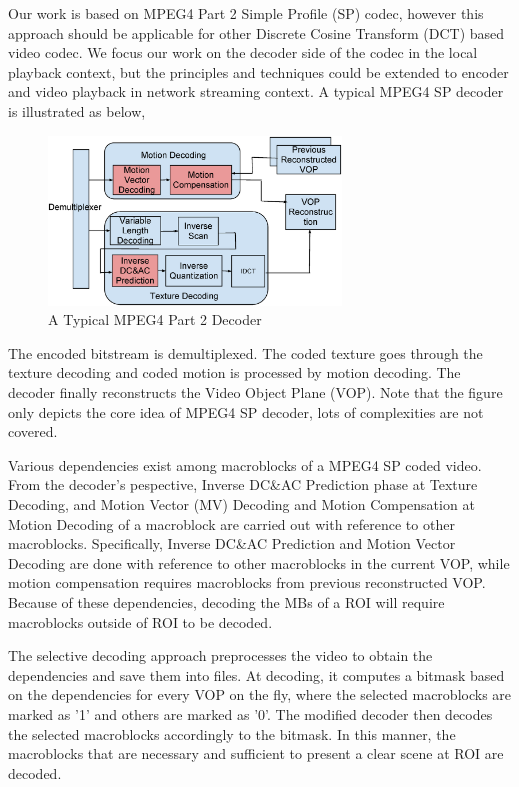 Our work is based on MPEG4 Part 2 Simple Profile (SP) codec, however this approach should be applicable for other Discrete Cosine Transform (DCT) based video codec. We focus our work on the decoder side of the codec in the local playback context, but the principles and techniques could be extended to encoder and video playback in network streaming context. A typical MPEG4 SP decoder is illustrated as below,
\begin{figure}
\centering
\includegraphics[height=4.5cm]{decoderb.eps}
\caption{A Typical MPEG4 Part 2 Decoder}
\end{figure}
The encoded bitstream is demultiplexed. The coded texture goes through the texture decoding and coded motion is processed by motion decoding. The decoder finally reconstructs the Video Object Plane (VOP). Note that the figure only depicts the core idea of MPEG4 SP decoder, lots of complexities are not covered. 

Various dependencies exist among macroblocks of a MPEG4 SP coded video. From the decoder's pespective, Inverse DC\&AC Prediction phase at Texture Decoding, and Motion Vector (MV) Decoding and Motion Compensation at Motion Decoding of a macroblock are carried out with reference to other macroblocks. Specifically, Inverse DC\&AC Prediction and Motion Vector Decoding are done with reference to other macroblocks in the current VOP, while motion compensation requires macroblocks from previous reconstructed VOP. Because of these dependencies, decoding the MBs of a ROI will require macroblocks outside of ROI to be decoded. 

The selective decoding approach preprocesses the video to obtain the dependencies and save them into files. At decoding, it computes a bitmask based on the dependencies for every VOP on the fly, where the selected macroblocks are marked as '1' and others are marked as '0'. The modified decoder then decodes the selected macroblocks accordingly to the bitmask. In this manner, the macroblocks that are necessary and sufficient to present a clear scene at ROI are decoded. 

